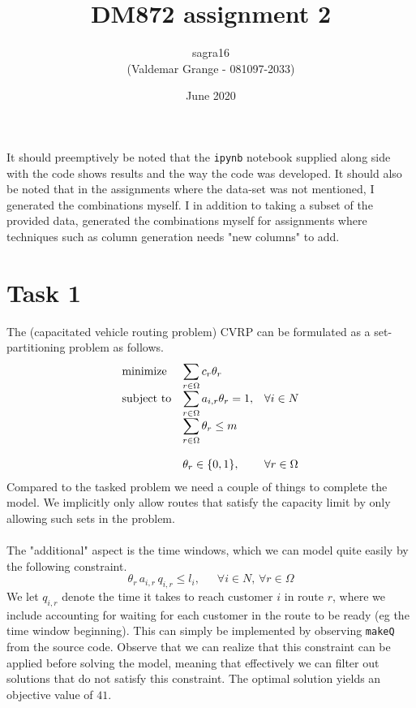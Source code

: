 \documentclass{article}
\title{DM872 assignment 2}
\author{sagra16 \\(Valdemar Grange - 081097-2033) }
\date{June 2020}
\begin{document}
    \maketitle
    It should preemptively be noted that the \texttt{ipynb} notebook supplied along side with the code shows results and the way the code was developed.
    It should also be noted that in the assignments where the data-set was not mentioned, I generated the combinations myself.
    I in addition to taking a subset of the provided data, generated the combinations myself for assignments where techniques such as column generation needs "new columns" to add.
    
    \clearpage

    \section*{Task 1}
    The (capacitated vehicle routing problem) CVRP can be formulated as a set-partitioning problem as follows.
    \begin{equation*}
        \begin{array}{ll@{}ll}
            \text{minimize}  & \displaystyle\sum_{r \in \Omega} c_r \theta_r& &\\
            \text{subject to}& \displaystyle\sum_{r \in \Omega} a_{i, r} \theta_r = 1 ,&   &\forall i \in N\\
                             & \displaystyle\sum_{r \in \Omega} \theta_r \leq m &&\\\\
                             & \displaystyle \theta_r  \in \{0,1\},  && \forall r \in \Omega
        \end{array}
    \end{equation*}
    Compared to the tasked problem we need a couple of things to complete the model.
    We implicitly only allow routes that satisfy the capacity limit by only allowing such sets in the problem.\\\\
    The "additional" aspect is the time windows, which we can model quite easily by the following constraint.
    \[
    \theta_r \, a_{i,r} \, q_{i,r} \leq l_i   , \,\,\,\,\,\,\,\,\, \forall i \in N, \, \forall r \in \Omega
    \]
    We let $q_{i,r}$ denote the time it takes to reach customer $i$ in route $r$, where we include accounting for waiting for each customer in the route to be ready (eg the time window beginning).
    This can simply be implemented by observing \texttt{makeQ} from the source code.
    Observe that we can realize that this constraint can be applied before solving the model, meaning that effectively we can filter out solutions that do not satisfy this constraint.
    The optimal solution yields an objective value of $41$.
\end{document}
